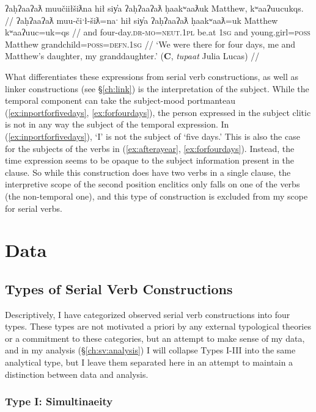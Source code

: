 \ex \label{ex:forfourdays}
\begingl
\glpreamble ʔaḥʔaaʔaƛ muučiiłšiƛna hił siy̓a ʔaḥʔaaʔaƛ ḥaakʷaaƛuk Matthew, kʷaaʔuucukqs. //
\gla ʔaḥʔaaʔaƛ muu-čiˑł-šiƛ=naˑ hił siy̓a ʔaḥʔaaʔaƛ ḥaakʷaaƛ=uk Matthew kʷaaʔuuc=uk=qs //
\glb and four-day.\textsc{dr}-\textsc{mo}=\textsc{neut.1pl} be.at \textsc{1sg} and young.girl=\textsc{poss} Matthew grandchild=\textsc{poss}=\textsc{defn.1sg} //
\glft `We were there for four days, me and Matthew's daughter, my granddaughter.' (\textbf{C}, \textit{tupaat} Julia Lucas) //
\endgl
\xe

What differentiates these expressions from serial verb constructions, as well as linker constructions (see \S\ref{ch:link}) is the interpretation of the subject. While the temporal component can take the subject-mood portmanteau (\ref{ex:inportforfivedays}, \ref{ex:forfourdays}), the person expressed in the subject clitic is not in any way the subject of the temporal expression. In (\ref{ex:inportforfivedays}), `I' is not the subject of `five days.' This is also the case for the subjects of the verbs in (\ref{ex:afterayear}, \ref{ex:forfourdays}). Instead, the time expression seems to be opaque to the subject information present in the clause. So while this construction does have two verbs in a single clause, the interpretive scope of the second position enclitics only falls on one of the verbs (the non-temporal one), and this type of construction is excluded from my scope for serial verbs.

\section{Data} \label{ch:sv:data}

\subsection{Types of Serial Verb Constructions}

Descriptively, I have categorized observed serial verb constructions into four types. These types are not motivated a priori by any external typological theories or a commitment to these categories, but an attempt to make sense of my data, and in my analysis (\S\ref{ch:sv:analysis}) I will collapse Types I-III into the same analytical type, but I leave them separated here in an attempt to maintain a distinction between data and analysis.

\vspace{10pt}

\subsubsection{Type I: Simultinaeity} \label{ch:sv:data:type1}

